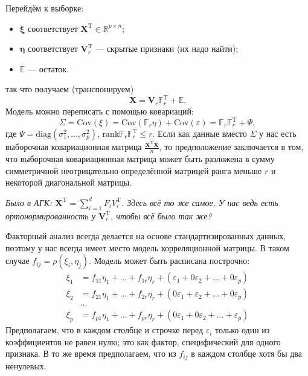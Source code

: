 \documentclass[12pt,a4paper,final]{article}
\newcommand{\X}{\bm{X}}
\newcommand{\1}{\mathds{1}}
\begin{document}
Перейдём к выборке: 
\begin{itemize}
\item $\bm \xi$ соответствует $\bm X^\mathrm{T} \in \mathbb{R}^{p \times n}$;
\item $\bm \eta$ соответствует $\bm V_r^\mathrm{T}$ --- скрытые признаки (их надо найти);
\item $\mathbb{E}$ --- остаток.
\end{itemize}
так что получаем (транспонируем)
$$
\bm X = \bm V_r \mathbb{F}_r^\mathrm{T} + \mathbb{E}.
$$
Модель можно переписать с помощью ковариаций:
$$
\Sigma = \mathrm{Cov}(\xi) = \mathrm{Cov}(\mathbb{F}_r \eta) + \mathrm{Cov}(\varepsilon) = \mathbb{F}_r \mathbb{F}_r^\mathrm{T} + \Psi,
$$
где $\Psi = \mathrm{diag}(\sigma_1^2,\ldots,\sigma_p^2)$, $\mathrm{rank} \mathbb{F}_r \mathbb{F}_r^\mathrm{T} \leqslant r$. Если как данные вместо $\Sigma$ у нас есть выборочная ковариационная матрица $\frac{\X^\mathrm{T} \X}{n}$, то предположение заключается в том, что выборочная ковариационная матрица может быть разложена в сумму симметричной неотрицательно определённой матрицей ранга меньше $r$ и некоторой диагональной матрицы.

\textit{Было в АГК: $\X^\mathrm{T} = \sum_{i = 1}^d F_i V_i^\mathrm{T}$. Здесь всё то же самое. У нас ведь есть ортонормированность у $\bm V_r^\mathrm{T}$, чтобы всё было так же?}

Факторный анализ всегда делается на основе стандартизированных данных, поэтому у нас всегда имеет место модель корреляционной матрицы. В таком случае $f_{ij} = \rho(\xi_i,\eta_j)$. Модель может быть расписана построчно:
\begin{align*}
\xi_1 &= f_{11} \eta_1 + \ldots + f_{1r} \eta_r + (\varepsilon_1 + 0\varepsilon_2 + \ldots + 0\varepsilon_p) \\
\xi_2 &= f_{21} \eta_1 + \ldots + f_{2r} \eta_r + (0\varepsilon_1 + \varepsilon_2 + \ldots + 0\varepsilon_p)  \\
&\ldots \\
\xi_p &= f_{p1} \eta_1 + \ldots + f_{pr} \eta_r + (0\varepsilon_1 + 0\varepsilon_2 + \ldots + \varepsilon_p)
\end{align*}
Предполагаем, что в каждом столбце и строчке перед $\varepsilon_i$ только один из коэффициентов не равен нулю; это как фактор, специфический для одного признака. В то же время предполагаем, что из $f_{ij}$ в каждом столбце хотя бы два ненулевых.
\end{document}

